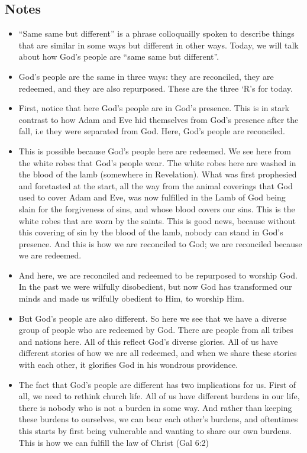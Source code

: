 \subsection*{Notes}
\begin{itemize}
  \item{``Same same but different'' is a phrase colloquailly spoken to describe things that are similar in some ways but different in other ways. Today, we will talk about how God’s people are “same same but different”.}
  \item{God’s people are the same in three ways: they are reconciled, they are redeemed, and they are also repurposed. These are the three `R's for today.}
  \item{First, notice that here God’s people are in God’s presence. This is in stark contrast to how Adam and Eve hid themselves from God’s presence after the fall, i.e they were separated from God. Here, God’s people are reconciled. }
  \item{This is possible because God’s people here are redeemed. We see here from the white robes that God’s people wear. The white robes here are washed in the blood of the lamb (somewhere in Revelation). What was first prophesied and foretasted at the start, all the way from the animal coverings that God used to cover Adam and Eve, was now fulfilled in the Lamb of God being slain for the forgiveness of sins, and whose blood covers our sins. This is the white robes that are worn by the saints. This is good news, because without this covering of sin by the blood of the lamb, nobody can stand in God’s presence. And this is how we are reconciled to God; we are reconciled because we are redeemed.}
  \item{And here, we are reconciled and redeemed to be repurposed to worship God. In the past we were wilfully disobedient, but now God has transformed our minds and made us wilfully obedient to Him, to worship Him. }
  \item{But God’s people are also different. So here we see that we have a diverse group of people who are redeemed by God. There are people from all tribes and nations here. All of this reflect God’s diverse glories. All of us have different stories of how we are all redeemed, and when we share these stories with each other, it glorifies God in his wondrous providence.}
  \item{The fact that God’s people are different has two implications for us. First of all, we need to rethink church life. All of us have different burdens in our life, there is nobody who is not a burden in some way. And rather than keeping these burdens to ourselves, we can bear each other’s burdens, and oftentimes this starts by first being vulnerable and wanting to share our own burdens. This is how we can fulfill the law of Christ (Gal 6:2)}

\end{itemize}

